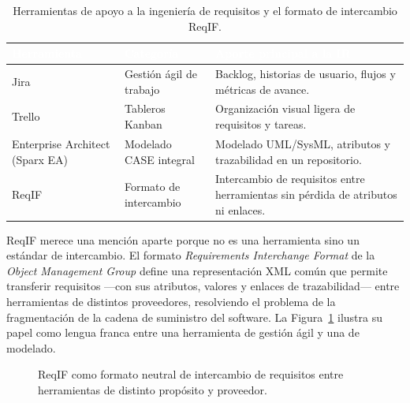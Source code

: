 \documentclass[11pt,a4paper,oneside]{report}
\newcommand{\hd}[1]{\cellcolor{darkblue}\textbf{\textcolor{white}{\small\sffamily #1}}}
\begin{document}
	\begin{table}[htbp]
		\centering
		\caption{Herramientas de apoyo a la ingenier\'ia de requisitos y el formato de intercambio ReqIF.}
		\label{tab:case}
		\small\sffamily
		\begin{tabularx}{\linewidth}{@{}L{3.6cm} L{3.3cm} X@{}}
			\toprule
			\hd{Herramienta} & \hd{Categor\'ia} & \hd{Aporte principal a la IR}\\
			\midrule
			Jira & Gesti\'on \'agil de trabajo & Backlog, historias de usuario, flujos y m\'etricas de avance.\\
			Trello & Tableros Kanban & Organizaci\'on visual ligera de requisitos y tareas.\\
			Enterprise Architect (Sparx EA) & Modelado CASE integral & Modelado UML/SysML, atributos y trazabilidad en un repositorio.\\
			ReqIF & Formato de intercambio & Intercambio de requisitos entre herramientas sin p\'erdida de atributos ni enlaces.\\
			\bottomrule
		\end{tabularx}
	\end{table}
	
	ReqIF merece una menci\'on aparte porque no es una herramienta sino un est\'andar de intercambio. El formato \textit{Requirements Interchange Format} de la \textit{Object Management Group} \citep{omg_reqif_2016} define una representaci\'on XML com\'un que permite transferir requisitos ---con sus atributos, valores y enlaces de trazabilidad--- entre herramientas de distintos proveedores, resolviendo el problema de la fragmentaci\'on de la cadena de suministro del software. La Figura~\ref{fig:reqif} ilustra su papel como lengua franca entre una herramienta de gesti\'on \'agil y una de modelado.
	
	\begin{figure}[htbp]
		\centering
		\caption{ReqIF como formato neutral de intercambio de requisitos entre herramientas de distinto prop\'osito y proveedor.}
		\label{fig:reqif}
	\end{figure}
	
\end{document}
